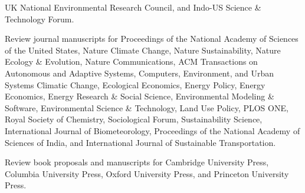   UK National Environmental Research Council,
  and Indo-US Science \& Technology Forum.
\item[Ongoing] Review journal manuscripts for
  Proceedings of the National Academy of Sciences of the United States,
  Nature Climate Change,
  Nature Sustainability,
  Nature Ecology \& Evolution,
  Nature Communications,
  ACM Transactions on Autonomous and Adaptive Systems,
  Computers, Environment, and Urban Systems
  Climatic Change,
  Ecological Economics,
  Energy Policy,
  Energy Economics,
  Energy Research \& Social Science,
  Environmental Modeling \& Software,
  Environmental Science \& Technology,
  Land Use Policy,
  PLOS ONE,
  Royal Society of Chemistry,
  Sociological Forum,
  Sustainability Science,
  International Journal of Biometeorology,
  Proceedings of the National Academy of Sciences of India,
  and
  International Journal of Sustainable Transportation.
\item[Ongoing] Review book proposals and manuscripts for
  Cambridge University Press,
  Columbia University Press,
  Oxford University Press,
  and Princeton University Press.
